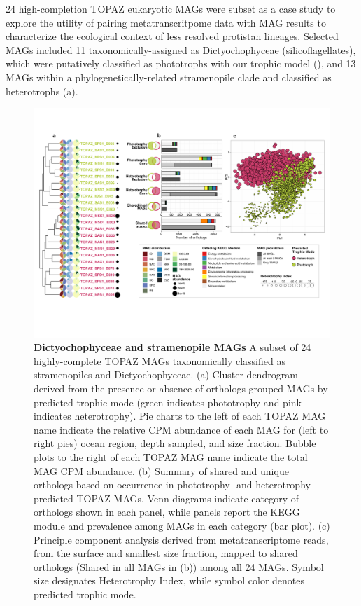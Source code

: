\documentclass[12pt]{article}
\numberwithin{equation}{section}
\begin{document}
24 high-completion TOPAZ eukaryotic MAGs were subset as a case study to explore the utility of pairing metatranscritpome data with MAG results to characterize the ecological context of less resolved protistan lineages. Selected MAGs included 11 taxonomically-assigned as Dictyochophyceae (silicoflagellates), which were putatively classified as phototrophs with our trophic model (), and 13 MAGs within a phylogenetically-related stramenopile clade and classified as heterotrophs (a). 


\begin{figure}[h!]    
    \centering
    \includegraphics[width = \columnwidth]{figures/Figure5-panel-plot-stramenopile-H.png}
    \caption{ \textbf{Dictyochophyceae and stramenopile MAGs} A subset of 24 highly-complete TOPAZ MAGs taxonomically classified as stramenopiles and Dictyochophyceae. (a) Cluster dendrogram derived from the presence or absence of orthologs grouped MAGs by predicted trophic mode (green indicates phototrophy and pink indicates heterotrophy). Pie charts to the left of each TOPAZ MAG name indicate the relative CPM abundance of each MAG for (left to right pies) ocean region, depth sampled, and size fraction. Bubble plots to the right of each TOPAZ MAG name indicate the total MAG CPM abundance. (b) Summary of shared and unique orthologs based on occurrence in phototrophy- and heterotrophy-predicted TOPAZ MAGs. Venn diagrams indicate category of orthologs shown in each panel, while panels report the KEGG module and prevalence among MAGs in each category (bar plot). (c) Principle component analysis derived from metatranscriptome reads, from the surface and smallest size fraction, mapped to shared orthologs (Shared in all MAGs in (b)) among all 24 MAGs. Symbol size designates Heterotrophy Index, while symbol color denotes predicted trophic mode. 
    }
    \label{fig:fig5-dicty}
\end{figure}
\end{document}
